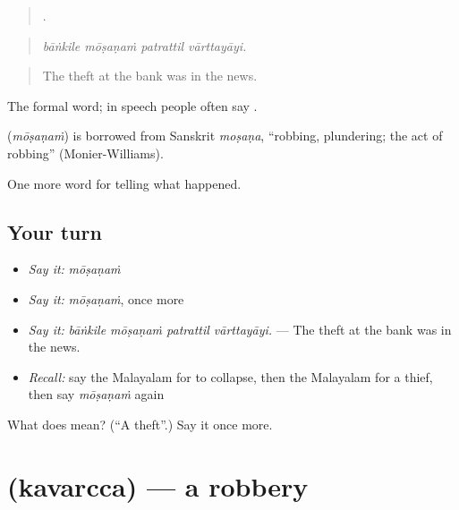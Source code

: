 \begin{quote}
   .
\end{quote}

\begin{quote}
\emph{bāṅkile mōṣaṇaṁ patrattil vārttayāyi.}
\end{quote}

\begin{quote}
The theft at the bank was in the news.
\end{quote}

The formal word; in speech people often say .

\begin{cousinweb}
\textbf{} (\emph{mōṣaṇaṁ}) is borrowed from Sanskrit \emph{moṣaṇa}, \textquotedblleft{}robbing, plundering; the act of robbing\textquotedblright{} (Monier-Williams).
\end{cousinweb}

\begin{grammarlens}[title={What you've built}]
One more word for telling what happened.
\end{grammarlens}

\subsection*{Your turn}
\begin{itemize}
\raggedright
  \item \emph{Say it:} \emph{mōṣaṇaṁ}
  \item \emph{Say it:} \emph{mōṣaṇaṁ}, once more
  \item \emph{Say it:} \emph{bāṅkile mōṣaṇaṁ patrattil vārttayāyi.} — The theft at the bank was in the news.
  \item \emph{Recall:} say the Malayalam for to collapse, then the Malayalam for a thief, then say \emph{mōṣaṇaṁ} again
\end{itemize}

\begin{tcolorbox}[breakable,colback=teal!4,colframe=teal!35!black,title={Before you move on}]
What does  mean? (\textquotedblleft{}A theft\textquotedblright{}.) Say it once more.
\end{tcolorbox}
\section[\texorpdfstring{\ml{കവർച്ച} (kavarcca)}{കവർച്ച (kavarcca)}]{ (kavarcca) — a robbery}

